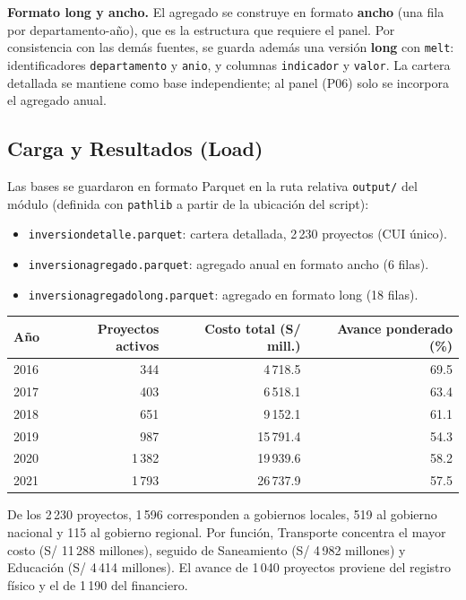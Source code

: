 \documentclass[12pt,a4paper]{article}
\newcommand{\var}[1]{{\renewcommand{\_}{\textunderscore\allowbreak}\texttt{#1}}}
\begin{document}
\textbf{Formato long y ancho.} El agregado se construye en formato \textbf{ancho} (una fila
por departamento-año), que es la estructura que requiere el panel. Por consistencia con las
demás fuentes, se guarda además una versión \textbf{long} con \var{melt}: identificadores
\var{departamento} y \var{anio}, y columnas \var{indicador} y \var{valor}. La cartera
detallada se mantiene como base independiente; al panel (P06) solo se incorpora el
agregado anual.

\subsection{Carga y Resultados (Load)}

Las bases se guardaron en formato Parquet en la ruta relativa \var{output/} del módulo
(definida con \var{pathlib} a partir de la ubicación del script):
\begin{itemize}
  \item \var{inversion\_detalle.parquet}: cartera detallada, 2\,230 proyectos (CUI único).
  \item \var{inversion\_agregado.parquet}: agregado anual en formato ancho (6 filas).
  \item \var{inversion\_agregado\_long.parquet}: agregado en formato long (18 filas).
\end{itemize}

\begin{center}
\begin{tabular}{@{}lrrr@{}}
\toprule
\textbf{Año} & \textbf{Proyectos activos} & \textbf{Costo total (S/ mill.)} & \textbf{Avance ponderado (\%)}\\
\midrule
2016 & 344   & 4\,718.5  & 69.5\\
2017 & 403   & 6\,518.1  & 63.4\\
2018 & 651   & 9\,152.1  & 61.1\\
2019 & 987   & 15\,791.4 & 54.3\\
2020 & 1\,382 & 19\,939.6 & 58.2\\
2021 & 1\,793 & 26\,737.9 & 57.5\\
\bottomrule
\end{tabular}
\end{center}

De los 2\,230 proyectos, 1\,596 corresponden a gobiernos locales, 519 al gobierno nacional
y 115 al gobierno regional. Por función, Transporte concentra el mayor costo (S/ 11\,288
millones), seguido de Saneamiento (S/ 4\,982 millones) y Educación (S/ 4\,414 millones).
El avance de 1\,040 proyectos proviene del registro físico y el de 1\,190 del financiero.
\end{document}
